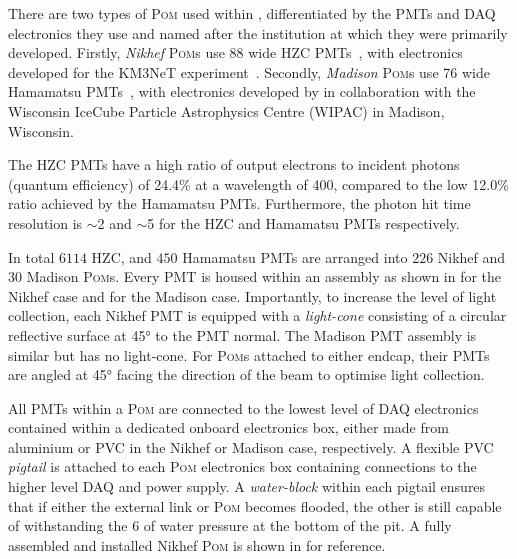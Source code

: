 There are two types of \textsc{Pom} used within \chipsfive, differentiated by the PMTs and DAQ
electronics they use and named after the institution at which they were primarily developed.
Firstly, \emph{Nikhef} \textsc{Pom}s use \SI{88}{} wide HZC PMTs~\cite{hzc}, with
electronics developed for the KM3NeT experiment~\cite{katz2009, adrian2016}. Secondly,
\emph{Madison} \textsc{Pom}s use \SI{76}{} wide Hamamatsu PMTs~\cite{hamamatsu}, with
electronics developed by \chips in collaboration with the Wisconsin IceCube Particle Astrophysics
Centre (WIPAC) in Madison, Wisconsin.

The HZC PMTs have a high ratio of output electrons to incident photons (quantum efficiency) of
24.4\% at a wavelength of \SI{400}{}, compared to the low 12.0\% ratio achieved by the
Hamamatsu PMTs. Furthermore, the photon hit time resolution is $\sim$\SI{2}{} and
$\sim$\SI{5}{} for the HZC and Hamamatsu PMTs respectively.

In total $6114$ HZC, and $450$ Hamamatsu PMTs are arranged into $226$ Nikhef and $30$ Madison
\textsc{Pom}s. Every PMT is housed within an assembly as shown in
 for the Nikhef case and 
for the Madison case. Importantly, to increase the level of light collection, each Nikhef PMT is
equipped with a \emph{light-cone} consisting of a circular reflective surface at \ang{45} to the
PMT normal. The Madison PMT assembly is similar but has no light-cone. For \textsc{Pom}s attached
to either endcap, their PMTs are angled at \ang{45} facing the direction of the beam to optimise
light collection.

All PMTs within a \textsc{Pom} are connected to the lowest level of DAQ electronics contained
within a dedicated onboard electronics box, either made from aluminium or PVC in the Nikhef or
Madison case, respectively. A flexible PVC \emph{pigtail} is attached to each \textsc{Pom}
electronics box containing connections to the higher level DAQ and power supply. A
\emph{water-block} within each pigtail ensures that if either the external link or \textsc{Pom}
becomes flooded, the other is still capable of withstanding the \SI{6}{} of water
pressure at the bottom of the pit. A fully assembled and installed Nikhef \textsc{Pom} is shown in
 for reference.

